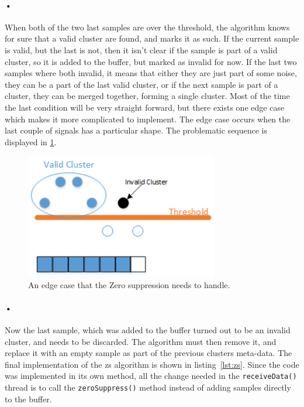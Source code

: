 \documentclass[a4paper, 12pt]{report}
\newcommand{\codeword}[1]{\texttt{#1}}
\begin{document}
\paragraph{•}
When both of the two last samples are over the threshold, the algorithm knows for sure that a valid cluster are found, and marks it as such.
If the current sample is valid, but the last is not, then it isn't clear if the sample is part of a valid cluster, so it is added to the buffer, but marked as invalid for now.
If the last two samples where both invalid, it means that either they are just part of some noise, they can be a part of the last valid cluster, or if the next sample is part of a cluster, they can be merged together, forming a single cluster.
Most of the time the last condition will be very straight forward, but there exists one edge case which makes it more complicated to implement.
The edge case occurs when the last couple of signals has a particular shape.
The problematic sequence is displayed in \ref{fig:zs-prob}.

\begin{figure}[h!]
	\centering
		\includegraphics[width=0.75\textwidth]{images/zs-prob.png}
		\caption{An edge case that the Zero suppression needs to handle.}
		\label{fig:zs-prob}
\end{figure}

\paragraph{•}
Now the last sample, which was added to the buffer turned out to be an invalid cluster, and needs to be discarded.
The algorithm must then remove it, and replace it with an empty sample as part of the previous clusters meta-data.
The final implementation of the \gls{zs} algorithm is shown in listing~\ref{lst:zs}.
Since the code was implemented in its own method, all the change needed in the \codeword{receiveData()} thread is to call the \codeword{zeroSuppress()} method instead of adding samples directly to the buffer.
\end{document}
